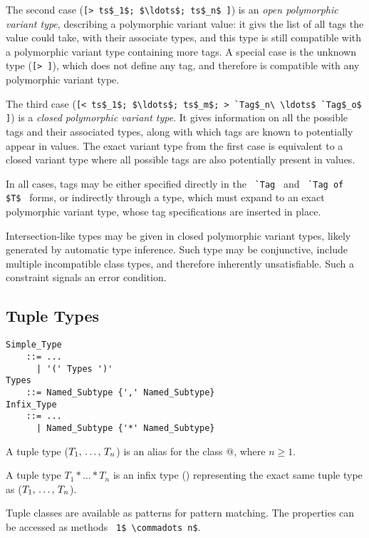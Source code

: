The second case (\lstinline![> ts$_1$; $\ldots$; ts$_n$ ]!) is an {\em open polymorphic variant type}, describing a polymorphic variant value: it givs the list of all tags the value could take, with their associate types, and this type is still compatible with a polymorphic variant type containing more tags. A special case is the unknown type (\lstinline![> ]!), which does not define any tag, and therefore is compatible with any polymorphic variant type. 

The third case (\lstinline![< ts$_1$; $\ldots$; ts$_m$; > `Tag$_n\ \ldots$ `Tag$_o$ ]!) is a {\em closed polymorphic variant type}. It gives information on all the possible tags and their associated types, along with which tags are known to potentially appear in values. The exact variant type from the first case is equivalent to a closed variant type where all possible tags are also potentially present in values. 

In all cases, tags may be either specified directly in the ~\lstinline!`Tag!~ and ~\lstinline!`Tag of $T$!~ forms, or indirectly through a type, which must expand to an exact polymorphic variant type, whose tag specifications are inserted in place. 

Intersection-like types may be given in closed polymorphic variant types, likely generated by automatic type inference. Such type may be conjunctive, include multiple incompatible class types, and therefore inherently unsatisfiable. Such a constraint signals an error condition. 





\subsection{Tuple Types}
\label{sec:tuple-types}

\grammar\begin{lstlisting}
Simple_Type 
    ::= ...
      | '(' Types ')'
Types
    ::= Named_Subtype {',' Named_Subtype}
Infix_Type 
    ::= ...
      | Named_Subtype {'*' Named_Subtype}
\end{lstlisting}

A tuple type ($T_1 \commadots T_n$) is an alias for the class \lstinline@Tuple[$T_1 \commadots T_n$]@, where $n \geq 1$. 

A tuple type $T_1 * \ldots * T_n$ is an infix type () representing the exact same tuple type as ($T_1 \commadots T_n$).

Tuple classes are available as patterns for pattern matching. The properties can be accessed as methods ~\lstinline!1$ \commadots n$!. 

